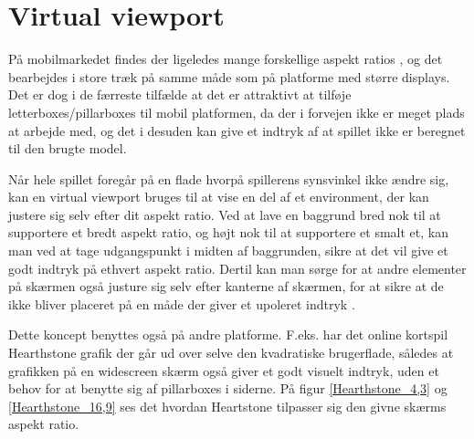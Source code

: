 \documentclass[Main.tex]{AspectRatio.tex}
\begin{document}
\section{Virtual viewport}

På mobilmarkedet findes der ligeledes mange forskellige aspekt ratios \cite{CommonResolutions}, og det bearbejdes i store træk på samme måde som på platforme med større displays. Det er dog i de færreste tilfælde at det er attraktivt at tilføje letterboxes/pillarboxes til mobil platformen, da der i forvejen ikke er meget plads at arbejde med, og det i desuden kan give et indtryk af at spillet ikke er beregnet til den brugte model.

Når hele spillet foregår på en flade hvorpå spillerens synsvinkel ikke ændre sig, kan en virtual viewport bruges til at vise en del af et environment, der kan justere sig selv efter dit aspekt ratio. Ved at lave en baggrund bred nok til at supportere et bredt aspekt ratio, og højt nok til at supportere et smalt et, kan man ved at tage udgangspunkt i midten af baggrunden, sikre at det vil give et godt indtryk på ethvert aspekt ratio. Dertil kan man sørge for at andre elementer på skærmen også justure sig selv efter kanterne af skærmen, for at sikre at de ikke bliver placeret på en måde der giver et upoleret indtryk \cite{gemserk}.

Dette koncept benyttes også på andre platforme. F.eks. har det online kortspil Hearthstone \cite{HSGame} grafik der går ud over selve den kvadratiske brugerflade, således at grafikken på en widescreen skærm også giver et godt visuelt indtryk, uden et behov for at benytte sig af pillarboxes i siderne. På figur \ref{Hearthstone_4,3} og \ref{Hearthstone_16,9} ses det hvordan Heartstone tilpasser sig den givne skærms aspekt ratio.
\end{document}
